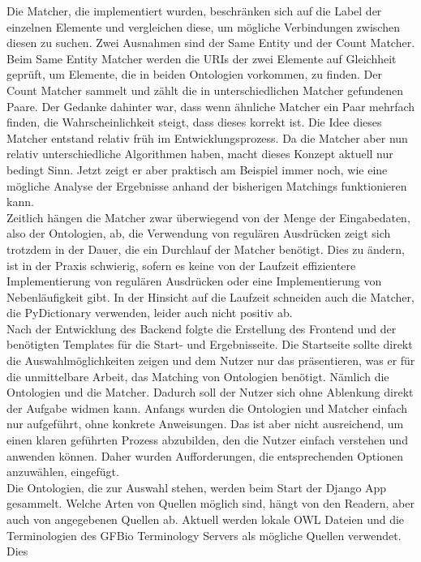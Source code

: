 Die Matcher, die implementiert wurden, beschränken sich auf die Label der
einzelnen Elemente und vergleichen diese, um mögliche Verbindungen zwischen
diesen zu suchen. Zwei Ausnahmen sind der Same Entity und der Count Matcher.
Beim Same Entity Matcher werden die URIs der zwei Elemente auf Gleichheit
geprüft, um Elemente, die in beiden Ontologien vorkommen, zu finden. Der Count
Matcher sammelt und zählt die in unterschiedlichen Matcher gefundenen Paare. 
Der Gedanke dahinter war, dass wenn ähnliche Matcher ein Paar mehrfach finden,
die Wahrscheinlichkeit steigt, dass dieses korrekt ist. Die Idee dieses
Matcher entstand relativ früh im Entwicklungsprozess. Da die Matcher aber nun
relativ unterschiedliche Algorithmen haben, macht dieses Konzept aktuell nur
bedingt Sinn. Jetzt zeigt er aber praktisch am Beispiel immer noch, wie eine
mögliche Analyse der Ergebnisse anhand der bisherigen Matchings funktionieren kann.\\
Zeitlich hängen die Matcher zwar überwiegend von der Menge
der Eingabedaten, also der Ontologien, ab, die Verwendung von regulären Ausdrücken
zeigt sich trotzdem in der Dauer, die ein Durchlauf der Matcher benötigt. Dies
zu ändern, ist in der Praxis schwierig, sofern es keine von der Laufzeit
effizientere Implementierung von regulären Ausdrücken oder eine Implementierung
von Nebenläufigkeit gibt.
In der Hinsicht auf die Laufzeit
schneiden auch die Matcher, die PyDictionary verwenden, leider auch nicht
positiv ab.\\
Nach der Entwicklung des Backend folgte die Erstellung des Frontend und der
benötigten Templates für die Start- und Ergebnisseite. Die Startseite sollte
direkt die Auswahlmöglichkeiten zeigen und dem Nutzer nur das präsentieren, was
er für die unmittelbare Arbeit, das Matching von Ontologien benötigt. Nämlich
die Ontologien und die Matcher. Dadurch soll der Nutzer sich ohne Ablenkung
direkt der Aufgabe widmen kann. Anfangs wurden die Ontologien und Matcher
einfach nur aufgeführt, ohne konkrete Anweisungen. Das ist aber nicht
ausreichend, um einen klaren geführten Prozess abzubilden, den die Nutzer
einfach verstehen und anwenden können. Daher wurden Aufforderungen, die
entsprechenden Optionen anzuwählen, eingefügt.\\
Die Ontologien, die zur Auswahl stehen, werden beim Start der Django App
gesammelt. Welche Arten von Quellen möglich sind, hängt von den Readern, aber
auch von angegebenen Quellen ab. Aktuell werden lokale OWL Dateien und die
Terminologien des GFBio Terminology Servers als mögliche Quellen verwendet. Dies
